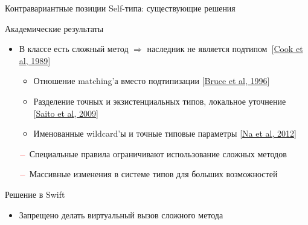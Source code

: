 \documentclass[usenames, dvipsnames]{beamer}
\begin{document}
\begin{frame}[fragile]{Контравариантные позиции Self-типа: существующие решения}
        \begin{block}{Академические результаты}
            \begin{itemize}
                \item В классе есть сложный метод $\Rightarrow$ наследник не является подтипом~[\href{https://dl.acm.org/doi/pdf/10.1145/96709.96721}{Cook et al, 1989}]
                \begin{itemize}
                    \item Отношение matching'а вместо подтипизации [\href{https://www.researchgate.net/profile/Kim-Bruce-2/publication/221496196_Subtyping_Is_Not_a_Good_Match_for_Object-Oriented_Languages/links/09e415122545c6d7a4000000/Subtyping-Is-Not-a-Good-Match-for-Object-Oriented-Languages.pdf}{Bruce et al, 1996}]
                    \item Разделение точных и экзистенциальных типов, локальное уточнение [\href{http://www.fos.kuis.kyoto-u.ac.jp/~igarashi/papers/pdf/thistype-SAC09.pdf}{Saito et al, 2009}]
                    \item Именованные wildcard'ы и точные типовые параметры [\href{https://www.researchgate.net/profile/Sukyoung-Ryu/publication/254004584_Exact_type_parameterization_and_ThisType_support/links/54b90ed10cf269d8cbf72d01/Exact-type-parameterization-and-ThisType-support.pdf}{Na et al, 2012}]
                \end{itemize}
                \item[$\color{red} -$] Специальные правила ограничивают использование сложных методов
                \item[$\color{red} -$] Массивные изменения в системе типов для больших возможностей
            \end{itemize}
        \end{block}

        \begin{block}{Решение в Swift}
            \begin{itemize}
                \item Запрещено делать виртуальный вызов сложного метода
            \end{itemize}
        \end{block}
    \end{frame}
\end{document}
